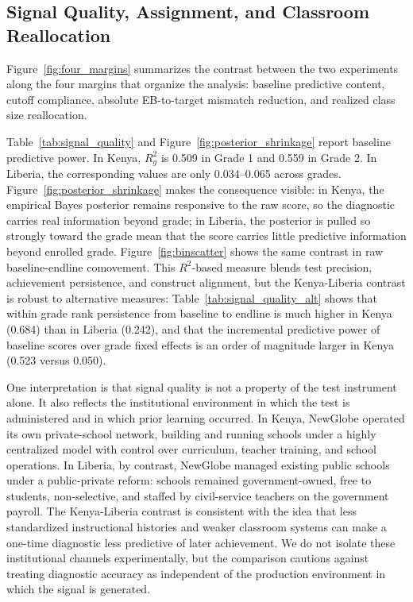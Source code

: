 \documentclass[11pt]{article}
\begin{document}
\subsection{Signal Quality, Assignment, and Classroom Reallocation}

Figure~\ref{fig:four_margins} summarizes the contrast between the two experiments along the four margins that organize the analysis: baseline predictive content, cutoff compliance, absolute EB-to-target mismatch reduction, and realized class size reallocation.

Table~\ref{tab:signal_quality} and Figure~\ref{fig:posterior_shrinkage} report baseline predictive power. In Kenya, $R^2_g$ is 0.509 in Grade 1 and 0.559 in Grade 2. In Liberia, the corresponding values are only 0.034--0.065 across grades. Figure~\ref{fig:posterior_shrinkage} makes the consequence visible: in Kenya, the empirical Bayes posterior remains responsive to the raw score, so the diagnostic carries real information beyond grade; in Liberia, the posterior is pulled so strongly toward the grade mean that the score carries little predictive information beyond enrolled grade. Figure~\ref{fig:binscatter} shows the same contrast in raw baseline-endline comovement. This $R^2$-based measure blends test precision, achievement persistence, and construct alignment, but the Kenya-Liberia contrast is robust to alternative measures: Table~\ref{tab:signal_quality_alt} shows that within grade rank persistence from baseline to endline is much higher in Kenya (0.684) than in Liberia (0.242), and that the incremental predictive power of baseline scores over grade fixed effects is an order of magnitude larger in Kenya (0.523 versus 0.050).

One interpretation is that signal quality is not a property of the test instrument alone. It also reflects the institutional environment in which the test is administered and in which prior learning occurred. In Kenya, NewGlobe operated its own private-school network, building and running schools under a highly centralized model with control over curriculum, teacher training, and school operations. In Liberia, by contrast, NewGlobe managed existing public schools under a public\mbox{-}private reform: schools remained government-owned, free to students, non-selective, and staffed by civil-service teachers on the government payroll. The Kenya-Liberia contrast is consistent with the idea that less standardized instructional histories and weaker classroom systems can make a one\mbox{-}time diagnostic less predictive of later achievement. We do not isolate these institutional channels experimentally, but the comparison cautions against treating diagnostic accuracy as independent of the production environment in which the signal is generated.
\end{document}
